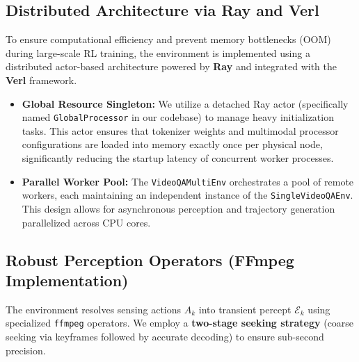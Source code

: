 \documentclass{article}
\theoremstyle{plain}
\theoremstyle{definition}
\theoremstyle{remark}
\begin{document}
\subsection{Distributed Architecture via Ray and Verl}
To ensure computational efficiency and prevent memory bottlenecks (OOM) during large-scale RL training, the environment is implemented using a distributed actor-based architecture powered by \textbf{Ray} and integrated with the \textbf{Verl} framework.
\begin{itemize}[leftmargin=15pt, topsep=2pt]
    \item \textbf{Global Resource Singleton:} We utilize a detached Ray actor (specifically named \texttt{GlobalProcessor} in our codebase) to manage heavy initialization tasks. This actor ensures that tokenizer weights and multimodal processor configurations are loaded into memory exactly once per physical node, significantly reducing the startup latency of concurrent worker processes.
    \item \textbf{Parallel Worker Pool:} The \texttt{VideoQAMultiEnv} orchestrates a pool of remote workers, each maintaining an independent instance of the \texttt{SingleVideoQAEnv}. This design allows for asynchronous perception and trajectory generation parallelized across CPU cores.
\end{itemize}

\subsection{Robust Perception Operators (FFmpeg Implementation)}
The environment resolves sensing actions $A_k$ into transient percept $\mathcal{E}_k$ using specialized \texttt{ffmpeg} operators. We employ a \textbf{two-stage seeking strategy} (coarse seeking via keyframes followed by accurate decoding) to ensure sub-second precision.
\end{document}
